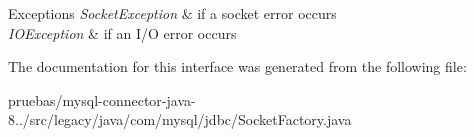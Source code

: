 \begin{DoxyExceptions}{Exceptions}
{\em Socket\+Exception} & if a socket error occurs \\
\hline
{\em I\+O\+Exception} & if an I/O error occurs \\
\hline
\end{DoxyExceptions}


The documentation for this interface was generated from the following file\+:\begin{DoxyCompactItemize}
\item 
pruebas/mysql-\/connector-\/java-\/8../src/legacy/java/com/mysql/jdbc/Socket\+Factory.\+java\end{DoxyCompactItemize}
